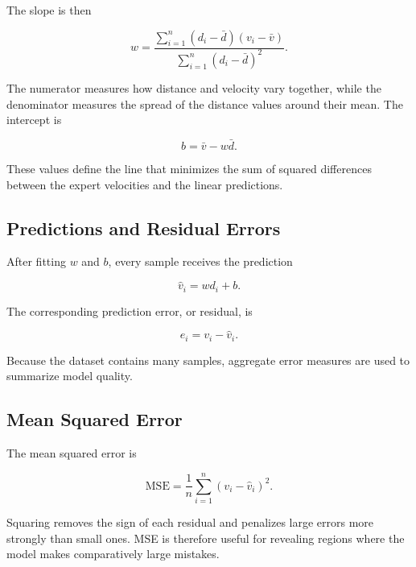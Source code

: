 \documentclass[10pt,twocolumn,a4paper]{article}
\begin{document}
The slope is then

\begin{equation}
    w
    =
    \frac{
        \sum_{i=1}^{n}(d_i-\bar{d})(v_i-\bar{v})
    }{
        \sum_{i=1}^{n}(d_i-\bar{d})^2
    }.
    \label{eq:slope}
\end{equation}

The numerator measures how distance and velocity vary together, while the
denominator measures the spread of the distance values around their mean.
The intercept is

\begin{equation}
    b = \bar{v}-w\bar{d}.
    \label{eq:intercept}
\end{equation}

These values define the line that minimizes the sum of squared differences
between the expert velocities and the linear predictions.

\subsection{Predictions and Residual Errors}

After fitting $w$ and $b$, every sample receives the prediction

\begin{equation}
    \hat{v}_i = w d_i+b.
\end{equation}

The corresponding prediction error, or residual, is

\begin{equation}
    e_i=v_i-\hat{v}_i.
    \label{eq:residual}
\end{equation}

Because the dataset contains many samples, aggregate error measures are used
to summarize model quality.

\subsection{Mean Squared Error}

The mean squared error is

\begin{equation}
    \mathrm{MSE}
    =
    \frac{1}{n}
    \sum_{i=1}^{n}
    (v_i-\hat{v}_i)^2.
    \label{eq:mse}
\end{equation}

Squaring removes the sign of each residual and penalizes large errors more
strongly than small ones. MSE is therefore useful for revealing regions where
the model makes comparatively large mistakes.
\end{document}

